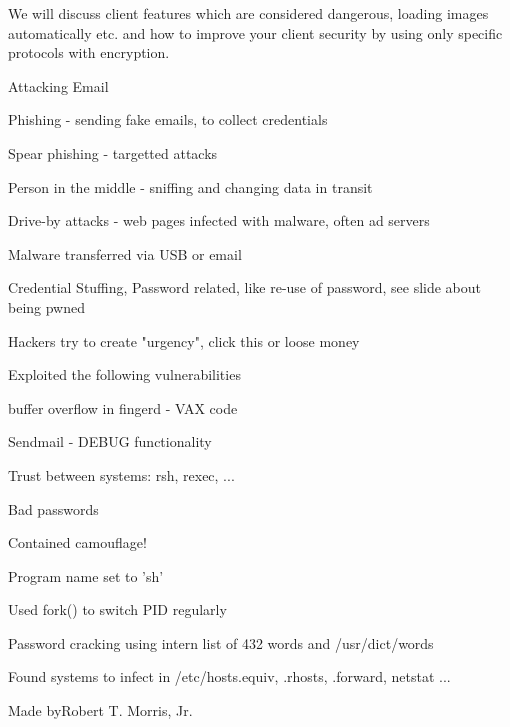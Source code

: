 \documentclass[Screen16to9,17pt]{foils}
\begin{document}


We will discuss client features which are considered dangerous, loading images automatically etc. and how to improve your client security by using only specific protocols with encryption.




Attacking Email
\begin{list2}
\item Phishing - sending fake emails, to collect credentials
\item Spear phishing - targetted attacks
\item Person in the middle - sniffing and changing data in transit
\item Drive-by attacks - web pages infected with malware, often ad servers
\item Malware transferred via USB or email
\item Credential Stuffing, Password related, like re-use of password, see slide about being pwned
\end{list2}


\vskip 1cm
Hackers try to create "urgency", click this or loose money



\begin{list1}
\item Exploited the following vulnerabilities
\begin{list2}
\item buffer overflow in fingerd - VAX code
\item Sendmail - DEBUG functionality
\item Trust between systems: rsh, rexec, ...
\item Bad passwords
\end{list2}
\item Contained camouflage!
\begin{list2}
\item Program name set to 'sh'
\item Used fork() to switch PID regularly
\item Password cracking using intern list of 432 words and /usr/dict/words
\item Found systems to infect in /etc/hosts.equiv, .rhosts, .forward, netstat ...
\end{list2}
\item Made byRobert T. Morris, Jr.
\end{list1}
\end{document}
